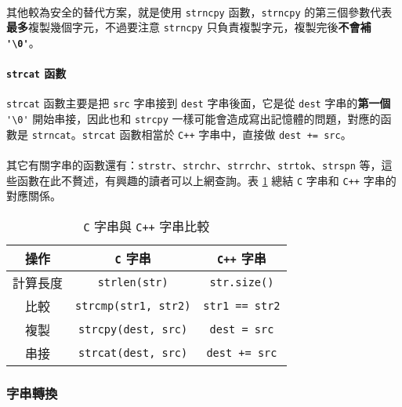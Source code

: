 \documentclass[12pt,a4paper,oneside]{article}
\begin{document}
\begin{CJK}{UTF8}{bkai}
\paragraph{}其他較為安全的替代方案，就是使用 \lstinline!strncpy! 函數，\lstinline!strncpy! 的第三個參數代表\textbf{最多}複製幾個字元，不過要注意 \lstinline!strncpy! 只負責複製字元，複製完後{\color{blue}\textbf{不會補 \lstinline!'\0'!}}。

\paragraph{\lstinline!strcat! 函數}\lstinline!strcat! 函數主要是把 \lstinline!src! 字串接到 \lstinline!dest! 字串後面，它是從 \lstinline!dest! 字串的\textbf{第一個} \lstinline!'\0'! 開始串接，因此也和 \lstinline!strcpy! 一樣可能會造成寫出記憶體的問題，對應的函數是 \lstinline!strncat!。\lstinline!strcat! 函數相當於 \texttt{C++} 字串中，直接做 \lstinline!dest += src!。

\paragraph{}其它有關字串的函數還有：\lstinline!strstr!、\lstinline!strchr!、\lstinline!strrchr!、\lstinline!strtok!、\lstinline!strspn! 等，這些函數在此不贅述，有興趣的讀者可以上網查詢。表 \ref{string:mani:table:string:c:cpp} 總結 \texttt{C} 字串和 \texttt{C++} 字串的對應關係。

\begin{table}[h!]
  \centering
  \begin{tabular}{|c|c|c|}
  \hline
  \textbf{操作} & \texttt{C} 字串 & \texttt{C++} 字串\\
  \hline\hline
  計算長度 & \lstinline!strlen(str)! & \lstinline!str.size()!\\
  \hline
  比較 & \lstinline!strcmp(str1, str2)! & \lstinline!str1 == str2!\\
  \hline
  複製 & \lstinline!strcpy(dest, src)! & \lstinline!dest = src!\\
  \hline
  串接 & \lstinline!strcat(dest, src)! & \lstinline!dest += src!\\
  \hline
  \end{tabular}
  \caption{\texttt{C} 字串與 \texttt{C++} 字串比較}
  \label{string:mani:table:string:c:cpp}
\end{table}

\subsubsection{字串轉換}


\end{CJK}
\end{document}

